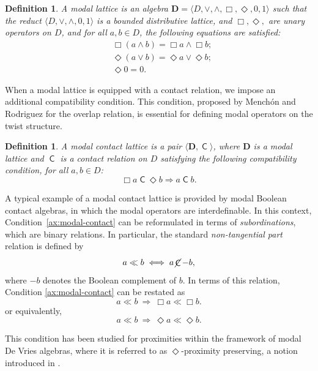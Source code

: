 \documentclass{article}
\newtheorem{definition}[theorem]{Definition}
\DeclareMathOperator{\con}{\mathsf{C}}
\DeclareMathOperator{\notcon}{\cancel{ \con}}
\newcommand{\D}{\mathbf{D}}
\begin{document}
\begin{definition}
    A \emph{modal lattice} is an algebra $\D=\langle D, \vee, \wedge,\Box, \Diamond, 0,1\rangle$ such that the reduct $\langle D, \vee, \wedge, 0,1\rangle$ is a bounded distributive lattice, and $\Box, \Diamond,$ are unary operators on $D$, and for all $a, b\in D$, the following equations are satisﬁed:
    \begin{align}
        \label{ml1}
        &\Box(a \wedge b) = \Box a \wedge \Box b;  \tag{ML1}\\
        \label{ml2}
        &\Diamond(a \vee b) = \Diamond a \vee \Diamond b; \tag{ML2}\\
        \label{ml3}
        &\Diamond 0=0. \tag{ML3}
    \end{align}
\end{definition}

When a modal lattice is equipped with a contact relation, we impose an additional compatibility condition. This condition, proposed by Menchón and Rodriguez \cite{Menchon2025} for the overlap relation, is essential for defining modal operators on the twist structure.

\begin{definition}
A \emph{modal contact lattice} is a pair $\langle \D,\con\rangle$, where $\D$ is a modal lattice and $\con$ is a contact relation on $D$ satisfying the following compatibility condition, for all $a,b\in D$:
\begin{equation}
\label{ax:modal-contact}\tag{MCL}
\Box a \con \Diamond b \Longrightarrow a \con b.
\end{equation}
\end{definition}

A typical example of a modal contact lattice is provided by modal Boolean contact algebras, in which the modal operators are interdefinable. In this context, Condition~\eqref{ax:modal-contact} can be reformulated in terms of \emph{subordinations}, which are binary relations. In particular, the standard \emph{non-tangential part} relation is defined by
\[
a \ll b \;\Longleftrightarrow\; a \notcon -b,
\]
where $-b$ denotes the Boolean complement of $b$. In terms of this relation, Condition \eqref{ax:modal-contact} can be restated as
\[
a \ll b \ \Longrightarrow\ \Box a \ll \Box b.
\]
or equivalently,
\[
a \ll b \ \Longrightarrow\ \Diamond a \ll \Diamond b.
\]

This condition has been studied for proximities within the framework of modal De Vries algebras, where it is referred to as $\Diamond$-proximity preserving, a notion introduced in \cite{bezhanishvili2015modal}.
\end{document}
